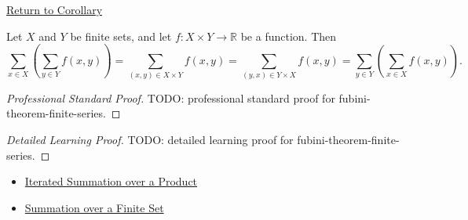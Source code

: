 \newpage
{}
\label{prf:fubini-theorem-finite-series}

\begin{remark*}[Return]
\hyperref[cor:fubini-theorem-finite-series]{Return to Corollary}
\end{remark*}

\begin{corollary*}
Let \(X\) and \(Y\) be finite sets, and let
\(f:X\times Y\to\mathbb{R}\) be a function. Then
\[
  \sum_{x\in X}
  \left(
    \sum_{y\in Y} f(x,y)
  \right)
  =
  \sum_{(x,y)\in X\times Y} f(x,y)
  =
  \sum_{(y,x)\in Y\times X} f(x,y)
  =
  \sum_{y\in Y}
  \left(
    \sum_{x\in X} f(x,y)
  \right).
\]
\end{corollary*}

\begin{proof}[Professional Standard Proof]
\LRAProofBodyStart
TODO: professional standard proof for fubini-theorem-finite-series.
\end{proof}

\begin{proof}[Detailed Learning Proof]
\LRAProofBodyStart
TODO: detailed learning proof for fubini-theorem-finite-series.
\end{proof}

\begin{remark*}
\end{remark*}

\begin{dependencies}
\begin{itemize}
  \item \hyperref[lem:iterated-summation-over-product]{Iterated Summation over a Product}
  \item \hyperref[def:summation-over-finite-set]{Summation over a Finite Set}
\end{itemize}
\end{dependencies}

\clearpage
